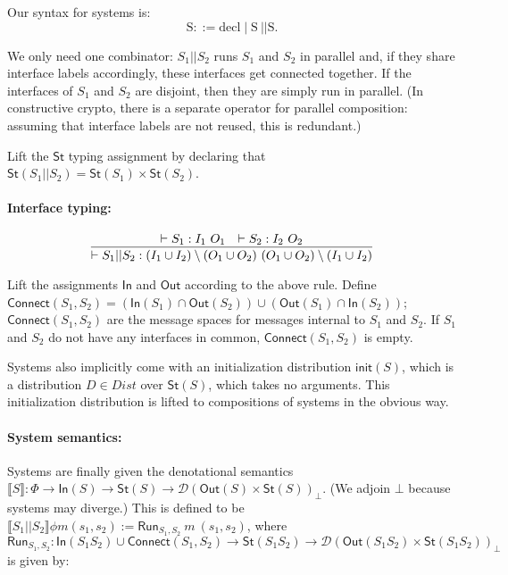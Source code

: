 \documentclass{article}
\begin{document}
Our syntax for systems is:
\[\text{S} ::= \text{decl} \mid \text{S}\ || \text{S}. \]


We only need one combinator: $S_1 || S_2$ runs $S_1$ and $S_2$ in parallel and, if they share interface labels accordingly, these interfaces get connected together. If the interfaces of $S_1$ and $S_2$ are disjoint, then they are simply run in parallel. (In constructive crypto, there is a separate operator for parallel composition: assuming that interface labels are not reused, this is redundant.)

Lift the $\textsf{St}$ typing assignment by declaring that $\textsf{St}(S_1 || S_2) = \textsf{St}(S_1) \times \textsf{St}(S_2)$.
\paragraph{Interface typing:}

\[\infer{\vdash S_1 || S_2 : (I_1 \cup I_2) \setminus (O_1 \cup O_2)\ (O_1 \cup O_2) \setminus (I_1 \cup I_2)}{\vdash S_1 : I_1\ O_1 & \vdash S_2 : I_2\ O_2}\]

Lift the assignments $\textsf{In}$ and $\textsf{Out}$ according to the above rule. Define $\textsf{Connect}(S_1, S_2) = (\textsf{In}(S_1) \cap \textsf{Out}(S_2)) \cup (\textsf{Out}(S_1) \cap \textsf{In}(S_2))$; $\textsf{Connect}(S_1, S_2)$ are the message spaces for messages internal to $S_1$ and $S_2$. If $S_1$ and $S_2$ do not have any interfaces in common, $\textsf{Connect}(S_1, S_2)$ is empty. 

Systems also implicitly come with an initialization distribution $\textsf{init}(S)$, which is a distribution $D \in \textit{Dist}$ over $\textsf{St}(S)$, which takes no arguments. This initialization distribution is lifted to compositions of systems in the obvious way.

\paragraph{System semantics:}

Systems are finally given the denotational semantics $\llbracket S \rrbracket : \Phi \to \textsf{In}(S) \to \textsf{St}(S) \to \mathcal{D}(\textsf{Out}(S) \times \textsf{St}(S))_\bot$. (We adjoin $\bot$ because systems may diverge.)
This is defined to be $\llbracket S_1 || S_2 \rrbracket \phi m (s_1, s_2) := \textsf{Run}_{S_1, S_2}\ m\ (s_1, s_2)$, where $$\textsf{Run}_{S_1, S_2} : \textsf{In}(S_1 S_2) \cup \textsf{Connect}(S_1, S_2) \to \textsf{St}(S_1 S_2) \to \mathcal{D}(\textsf{Out}(S_1 S_2) \times \textsf{St}(S_1 S_2))_\bot$$ is given by:
\end{document}
